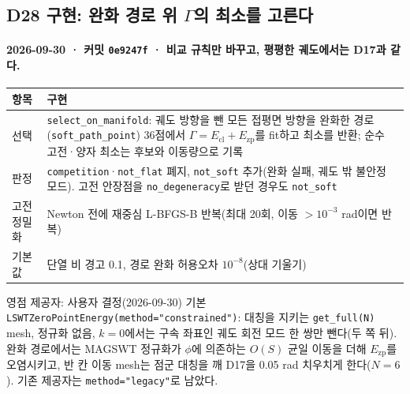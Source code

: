 \subsection{D28 구현: 완화 경로 위 $\Gamma$의 최소를 고른다}\label{d28-implementation}
\begingroup%
  \framesubtitle{2026-09-30 · 커밋 \texttt{0e9247f} · 비교 규칙만 바꾸고, 평평한 궤도에서는 D17과 같다.}
  \footnotesize\renewcommand{\arraystretch}{1.1}
  \begin{tabularx}{\textwidth}{@{}P{2.7cm}Y@{}}
    \toprule
    항목 & 구현 \\
    \midrule
    선택 & \texttt{select\_on\_manifold}: 궤도 방향을 뺀 모든 접평면 방향을 완화한 경로(\texttt{soft\_path\_point}) 36점에서 $\Gamma=E_{\mathrm{cl}}+E_{\mathrm{zp}}$를 fit하고 최소를 반환; 순수 고전·양자 최소는 후보와 이동량으로 기록 \\
    판정 & \texttt{competition}·\texttt{not\_flat} 폐지, \texttt{not\_soft} 추가(완화 실패, 궤도 밖 불안정 모드). 고전 안장점을 \texttt{no\_degeneracy}로 받던 경우도 \texttt{not\_soft} \\
    고전 정밀화 & Newton 전에 재중심 L-BFGS-B 반복(최대 20회, 이동 $>10^{-3}$ rad이면 반복) \\
    기본값 & 단열 비 경고 0.1, 경로 완화 허용오차 $10^{-8}$(상대 기울기) \\
    \bottomrule
  \end{tabularx}
  \par\medskip
  \begin{mdcallout}[note]{영점 제공자: 사용자 결정(2026-09-30)}
    기본 \texttt{LSWTZeroPointEnergy(method="constrained")}: 대칭을 지키는 \texttt{get\_full(N)} mesh, 정규화 없음, $k=0$에서는 구속 좌표인 궤도 회전 모드 한 쌍만 뺀다(두 쪽 뒤).
    완화 경로에서는 MAGSWT 정규화가 $\phi$에 의존하는 $O(S)$ 균일 이동을 더해 $E_{\mathrm{zp}}$를 오염시키고, 반 칸 이동 mesh는 점군 대칭을 깨 D17을 0.05 rad 치우치게 한다($N=6$).
    기존 제공자는 \texttt{method="legacy"}로 남았다.
  \end{mdcallout}
\endgroup


